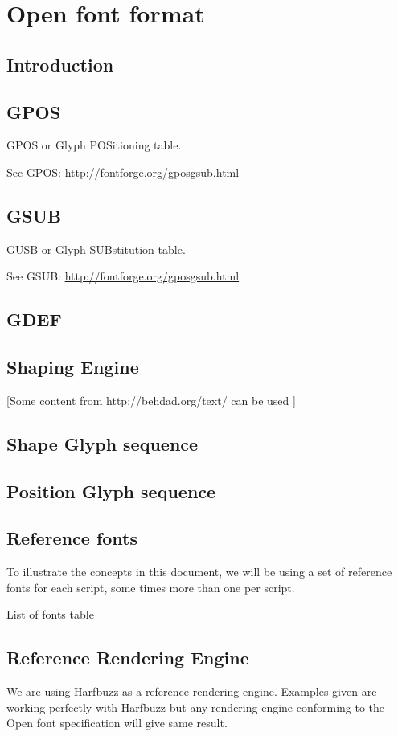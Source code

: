 \chapter{Open font format}

\section{Introduction}

\section{GPOS}

GPOS or Glyph POSitioning table.

See GPOS: {\url{http://fontforge.org/gposgsub.html}}

\section{GSUB}

GUSB or Glyph SUBstitution table.

See GSUB: {\url{http://fontforge.org/gposgsub.html}}

\section{GDEF}

\section{Shaping Engine}

[Some content from http://behdad.org/text/ can be used ]

\section{Shape Glyph sequence}

\section{Position Glyph sequence}

\section{Reference fonts}

To illustrate the concepts in this document, we will be using a set of
reference fonts for each script, some times more than one per script.

List of fonts table

\section{Reference Rendering Engine}

We are using Harfbuzz as a reference rendering engine. Examples given are
working perfectly with Harfbuzz but any rendering engine conforming to the
Open font specification will give same result.
